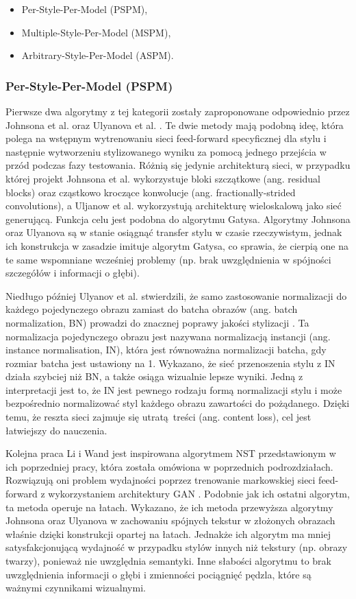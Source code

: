 \documentclass[12pt]{article}
\begin{document}
\begin{itemize}
    \item Per-Style-Per-Model (PSPM),
    \item Multiple-Style-Per-Model (MSPM),
    \item Arbitrary-Style-Per-Model (ASPM).
\end{itemize}

\subsubsection{Per-Style-Per-Model (PSPM)}

\indent

Pierwsze dwa algorytmy z tej kategorii zostały zaproponowane odpowiednio przez Johnsona et al. \cite{39} oraz Ulyanova et al. \cite{40}. Te dwie metody mają podobną ideę, która polega na wstępnym wytrenowaniu sieci feed-forward specyficznej dla stylu i następnie wytworzeniu stylizowanego wyniku za pomocą jednego przejścia w przód podczas fazy testowania. Różnią się jedynie architekturą sieci, w przypadku której projekt Johnsona et al. wykorzystuje bloki szczątkowe (ang. residual blocks) oraz cząstkowo kroczące konwolucje (ang. fractionally-strided convolutions), a Uljanow et al. wykorzystują architekturę wieloskalową jako sieć generującą. Funkcja celu jest podobna do algorytmu Gatysa. Algorytmy Johnsona oraz Ulyanova są w stanie osiągnąć transfer stylu w czasie rzeczywistym, jednak ich konstrukcja w zasadzie imituje algorytm Gatysa, co sprawia, że cierpią one na te same wspomniane wcześniej problemy (np. brak uwzględnienia w spójności szczegółów i informacji o głębi).

Niedługo później Ulyanov et al. stwierdzili, że samo zastosowanie normalizacji do każdego pojedynczego obrazu zamiast do batcha obrazów (ang. batch normalization, BN) prowadzi do znacznej poprawy jakości stylizacji \cite{41}. Ta normalizacja pojedynczego obrazu jest nazywana normalizacją instancji (ang. instance normalisation, IN), która jest równoważna normalizacji batcha, gdy rozmiar batcha jest ustawiony na 1. Wykazano, że sieć przenoszenia stylu z IN działa szybciej niż BN, a także osiąga wizualnie lepsze wyniki. Jedną z interpretacji jest to, że IN jest pewnego rodzaju formą normalizacji stylu i może bezpośrednio normalizować styl każdego obrazu zawartości do pożądanego. Dzięki temu, że reszta sieci zajmuje się utratą treści (ang. content loss), cel jest łatwiejszy do nauczenia.

Kolejna praca Li i Wand jest inspirowana algorytmem NST przedstawionym w ich poprzedniej pracy, która została omówiona w poprzednich podrozdziałach. Rozwiązują oni problem wydajności poprzez trenowanie markowskiej sieci feed-forward z wykorzystaniem architektury GAN \cite{42}. Podobnie jak ich ostatni algorytm, ta metoda operuje na łatach. Wykazano, że ich metoda przewyższa algorytmy Johnsona oraz Ulyanova w zachowaniu spójnych tekstur w złożonych obrazach właśnie dzięki konstrukcji opartej na łatach. Jednakże ich algorytm ma mniej satysfakcjonującą wydajność w przypadku stylów innych niż tekstury (np. obrazy twarzy), ponieważ nie uwzględnia semantyki. Inne słabości algorytmu to brak uwzględnienia informacji o głębi i zmienności pociągnięć pędzla, które są ważnymi czynnikami wizualnymi.
\end{document}
